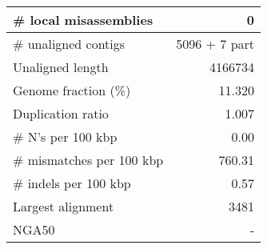 \documentclass[12pt,a4paper]{article}
\begin{document}
\begin{table}[ht]
\begin{center}
\begin{tabular}{|l*{1}{|r}|}
\# local misassemblies & 0 \\ \hline
\# unaligned contigs & 5096 + 7 part \\ \hline
Unaligned length & 4166734 \\ \hline
Genome fraction (\%) & 11.320 \\ \hline
Duplication ratio & 1.007 \\ \hline
\# N's per 100 kbp & 0.00 \\ \hline
\# mismatches per 100 kbp & 760.31 \\ \hline
\# indels per 100 kbp & 0.57 \\ \hline
Largest alignment & 3481 \\ \hline
NGA50 & - \\ \hline
\end{tabular}
\end{center}
\end{table}
\end{document}
